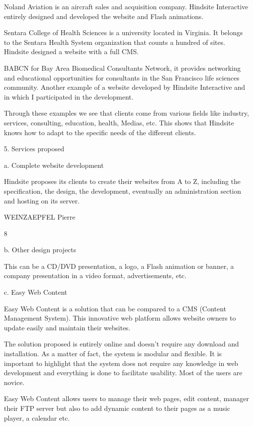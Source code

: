 Noland Aviation is an aircraft sales and acquisition company. Hindsite
Interactive entirely designed and developed the website and Flash animations.

Sentara College of Health Sciences is a university located in Virginia. It
belongs to the Sentara Health System organization that counts a hundred of
sites. Hindsite designed a website with a full CMS.

BABCN for Bay Area Biomedical Consultants Network, it provides
networking and educational opportunities for consultants in the San Francisco
life sciences community. Another example of a website developed by Hindsite
Interactive and in which I participated in the development.

Through these examples we see that clients come from various fields like
industry, services, consulting, education, health, Medias, etc.
This shows that Hindsite knows how to adapt to the specific needs of the
different clients.

5. Services proposed

a. Complete website development

Hindsite proposes its clients to create their websites from A to Z, including the
specification, the design, the development, eventually an administration
section and hosting on its server.

WEINZAEPFEL Pierre

8

b. Other design projects

This can be a CD/DVD presentation, a logo, a Flash animation or banner, a
company presentation in a video format, advertisements, etc.

c. Easy Web Content

Easy Web Content is a solution that can be compared to a CMS (Content
Management System). This innovative web platform allows website owners to
update easily and maintain their websites.

The solution proposed is entirely online and doesn’t require any download and
installation. As a matter of fact, the system is modular and flexible.
It is important to highlight that the system does not require any knowledge in web
development and everything is done to facilitate usability. Most of the users are
novice.

Easy Web Content allows users to manage their web pages, edit content, manager
their FTP server but also to add dynamic content to their pages as a music player, a
calendar etc.


